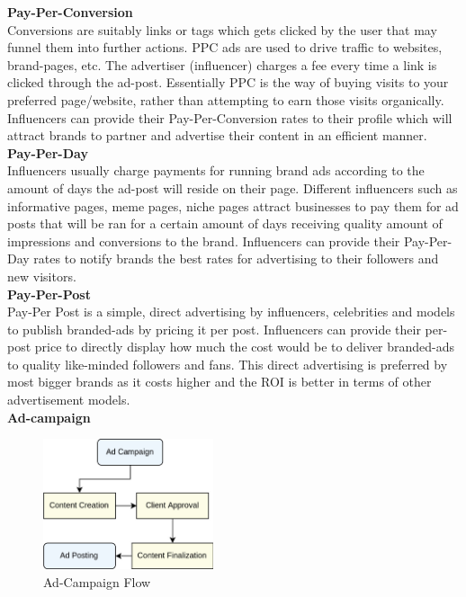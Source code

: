 \documentclass[conference]{IEEEtran}
\begin{document}
\textbf{Pay-Per-Conversion}\\

Conversions are suitably links or tags which gets clicked by the user that may funnel them into further actions. PPC ads are used to drive traffic to websites, brand-pages, etc. The advertiser (influencer) charges a fee every time a link is clicked through the ad-post. Essentially PPC is the way of buying visits to your preferred page/website, rather than attempting to earn those visits organically. Influencers can provide their Pay-Per-Conversion rates to their profile which will attract brands to partner and advertise their content in an efficient manner.\\ 

\textbf{Pay-Per-Day}\\

Influencers usually charge payments for running brand ads according to the amount of days the ad-post will reside on their page. Different influencers such as informative pages, meme pages, niche pages attract businesses to pay them for ad posts that will be ran for a certain amount of days receiving quality amount of impressions and conversions to the brand. Influencers can provide their Pay-Per-Day rates to notify brands the best rates for advertising to their followers and new visitors.\\

\textbf{Pay-Per-Post}\\

Pay-Per Post is a simple, direct advertising by influencers, celebrities and models to publish branded-ads by pricing it per post. Influencers can provide their per-post price to directly display how much the cost would be to deliver branded-ads to quality like-minded followers and fans. This direct advertising is preferred by most bigger brands as it costs higher and the ROI is better in terms of other advertisement models.\\

\textbf{Ad-campaign}\\

\begin{figure}[H]
\begin{center}
\includegraphics[width=5cm]{ad-flow}
\caption{Ad-Campaign Flow}
\end{center}
\end{figure}
\end{document}
